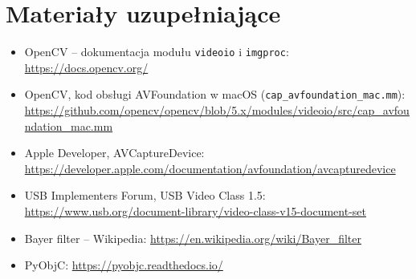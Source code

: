 \section{Materiały uzupełniające}
\begin{itemize}
  \item OpenCV -- dokumentacja modułu \texttt{videoio} i \texttt{imgproc}:
    \url{https://docs.opencv.org/}
  \item OpenCV, kod obsługi AVFoundation w macOS (\texttt{cap\_avfoundation\_mac.mm}):
    \url{https://github.com/opencv/opencv/blob/5.x/modules/videoio/src/cap_avfoundation_mac.mm}
  \item Apple Developer, AVCaptureDevice: \url{https://developer.apple.com/documentation/avfoundation/avcapturedevice}
  \item USB Implementers Forum, USB Video Class 1.5: \url{https://www.usb.org/document-library/video-class-v15-document-set}
  \item Bayer filter -- Wikipedia: \url{https://en.wikipedia.org/wiki/Bayer_filter}
  \item PyObjC: \url{https://pyobjc.readthedocs.io/}
\end{itemize}


